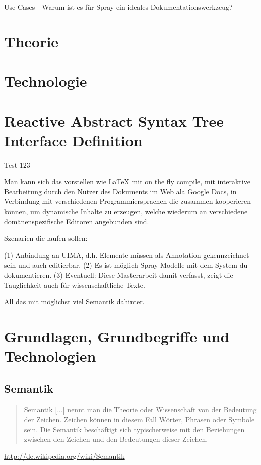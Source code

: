 Use Cases
  - Warum ist es für Spray ein ideales Dokumentationswerkzeug?



\chapter{Theorie}

\chapter{Technologie}

\chapter{Reactive Abstract Syntax Tree Interface Definition}

\citep{default}

Test $123$ \citep{6902013}

Man kann sich das vorstellen wie LaTeX mit on the fly compile,
mit interaktive Bearbeitung durch den Nutzer des Dokuments im Web ala
Google Docs, in Verbindung mit verschiedenen Programmiersprachen
die zusammen kooperieren können, um dynamische Inhalte zu erzeugen,
welche wiederum an verschiedene domänenspezifische Editoren angebunden sind.

Szenarien die laufen sollen:

(1) Anbindung an UIMA, d.h. Elemente müssen als Annotation gekennzeichnet sein
und auch editierbar.
(2) Es ist möglich Spray Modelle mit dem System du dokumentieren.
(3) Eventuell: Diese Masterarbeit damit verfasst, zeigt die Tauglichkeit
auch für wissenschaftliche Texte.

All das mit möglichst viel Semantik dahinter.

\chapter{Grundlagen, Grundbegriffe und Technologien}

\section{Semantik}

\begin{quote}Semantik [...] nennt man die Theorie oder Wissenschaft von der Bedeutung der Zeichen.
Zeichen können in diesem Fall Wörter, Phrasen oder Symbole sein. Die Semantik beschäftigt sich 
typischerweise mit den Beziehungen zwischen den Zeichen und den Bedeutungen dieser Zeichen.
\end{quote}
\url{http://de.wikipedia.org/wiki/Semantik}

